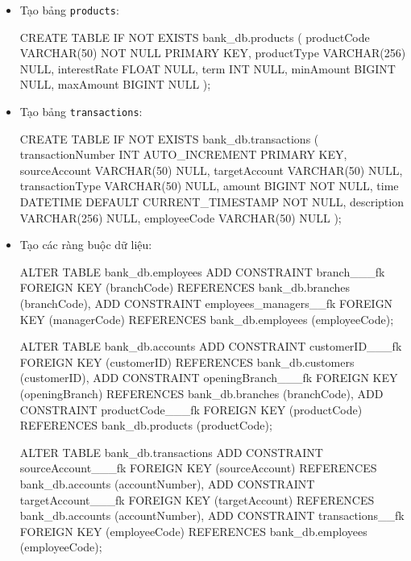 \begin{itemize}
    \item Tạo bảng \texttt{products}:
    \begin{MySQLCode}
        CREATE TABLE IF NOT EXISTS bank_db.products (
            productCode  VARCHAR(50)  NOT NULL PRIMARY KEY,
            productType  VARCHAR(256) NULL,
            interestRate FLOAT        NULL,
            term         INT          NULL,
            minAmount    BIGINT       NULL,
            maxAmount    BIGINT       NULL
        );
    \end{MySQLCode}

    \item Tạo bảng \texttt{transactions}:
    \begin{MySQLCode}
        CREATE TABLE IF NOT EXISTS bank_db.transactions (
            transactionNumber INT AUTO_INCREMENT PRIMARY KEY,
            sourceAccount     VARCHAR(50)  NULL,
            targetAccount     VARCHAR(50)  NULL,
            transactionType   VARCHAR(50)  NULL,
            amount            BIGINT       NOT NULL,
            time              DATETIME     DEFAULT CURRENT_TIMESTAMP NOT NULL,
            description       VARCHAR(256) NULL,
            employeeCode      VARCHAR(50)  NULL
        );
    \end{MySQLCode}

    \item Tạo các ràng buộc dữ liệu:
    \begin{MySQLCode}
        ALTER TABLE bank_db.employees
            ADD CONSTRAINT branch___fk
                FOREIGN KEY (branchCode) REFERENCES bank_db.branches (branchCode),
            ADD CONSTRAINT employees_managers__fk
                FOREIGN KEY (managerCode) REFERENCES bank_db.employees (employeeCode);

        ALTER TABLE bank_db.accounts
            ADD CONSTRAINT customerID___fk
                FOREIGN KEY (customerID) REFERENCES bank_db.customers (customerID),
            ADD CONSTRAINT openingBranch___fk
                FOREIGN KEY (openingBranch) REFERENCES bank_db.branches (branchCode),
            ADD CONSTRAINT productCode___fk
                FOREIGN KEY (productCode) REFERENCES bank_db.products (productCode);

        ALTER TABLE bank_db.transactions
            ADD CONSTRAINT sourceAccount___fk
                FOREIGN KEY (sourceAccount) REFERENCES bank_db.accounts (accountNumber),
            ADD CONSTRAINT targetAccount___fk
                FOREIGN KEY (targetAccount) REFERENCES bank_db.accounts (accountNumber),
            ADD CONSTRAINT transactions__fk
                FOREIGN KEY (employeeCode) REFERENCES bank_db.employees (employeeCode);
    \end{MySQLCode}


\end{itemize}
